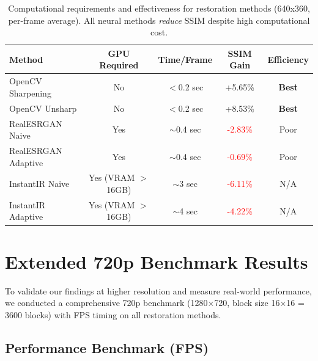 \documentclass[11pt,a4paper]{article}
\begin{document}
\begin{table}[h]
\centering
\begin{tabular}{lcccc}
\toprule
\textbf{Method} & \textbf{GPU Required} & \textbf{Time/Frame} & \textbf{SSIM Gain} & \textbf{Efficiency} \\
\midrule
OpenCV Sharpening & No & $<$0.2 sec & +5.65\% & \textbf{Best} \\
OpenCV Unsharp & No & $<$0.2 sec & +8.53\% & \textbf{Best} \\
RealESRGAN Naive & Yes & $\sim$0.4 sec & \textcolor{red}{-2.83\%} & Poor \\
RealESRGAN Adaptive & Yes & $\sim$0.4 sec & \textcolor{red}{-0.69\%} & Poor \\
InstantIR Naive & Yes (VRAM $>$16GB) & $\sim$3 sec & \textcolor{red}{-6.11\%} & N/A \\
InstantIR Adaptive & Yes (VRAM $>$16GB) & $\sim$4 sec & \textcolor{red}{-4.22\%} & N/A \\
\bottomrule
\end{tabular}
\caption{Computational requirements and effectiveness for restoration methods (640x360, per-frame average). All neural methods \emph{reduce} SSIM despite high computational cost.}
\end{table}

\section{Extended 720p Benchmark Results}
\label{sec:720p}

To validate our findings at higher resolution and measure real-world performance, we conducted a comprehensive 720p benchmark (1280$\times$720, block size 16$\times$16 = 3600 blocks) with FPS timing on all restoration methods.

\subsection{Performance Benchmark (FPS)}
\end{document}
